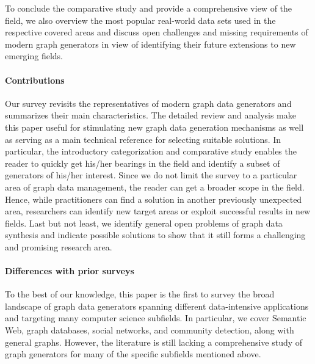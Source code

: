 To conclude the comparative study and provide a comprehensive view of the
field,  we also overview the most popular real-world data sets used in the respective covered areas and discuss open challenges and missing requirements of modern
graph generators in view of identifying their future extensions to new emerging fields.


\paragraph*{Contributions} Our survey revisits the representatives of
modern graph data generators and summarizes their main characteristics. The detailed review
and analysis make this paper useful for stimulating new graph data generation mechanisms as well as
serving as a main technical reference for selecting suitable solutions. In particular, the introductory
categorization and comparative study enables the reader to quickly get his/her bearings in the field and
identify a subset of generators of his/her interest. Since we do not limit the survey to a particular area of graph data management,  the reader can get a broader scope in the field. Hence, while practitioners can find a solution in another previously unexpected area, researchers can identify new target areas or exploit successful results in new fields. Last but not least, %
we identify general open problems of graph data synthesis and indicate possible solutions to show that it still forms a challenging and promising research area.

\paragraph*{Differences with prior surveys}

To the best of our knowledge, this paper is the first to survey the broad
landscape of graph data generators spanning different data-intensive applications and
targeting many computer science subfields. In particular, we cover Semantic Web, graph databases, social networks, and community detection, along with general graphs. However, the literature is still lacking a comprehensive study of graph generators  for many of the specific subfields mentioned above.

